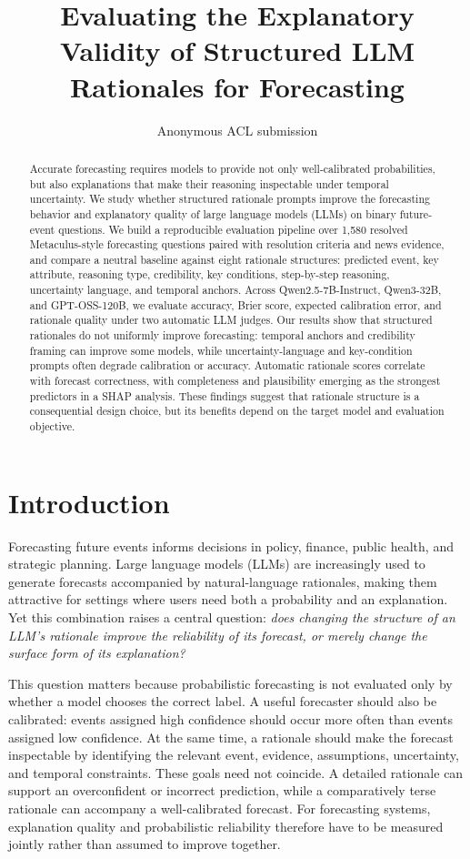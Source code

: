 \documentclass[11pt]{article}
\title{Evaluating the Explanatory Validity of Structured LLM Rationales for Forecasting}
\author{Anonymous ACL submission}
\date{}
\begin{document}
\maketitle

\begin{abstract}
Accurate forecasting requires models to provide not only well-calibrated probabilities, but also explanations that make their reasoning inspectable under temporal uncertainty.
We study whether structured rationale prompts improve the forecasting behavior and explanatory quality of large language models (LLMs) on binary future-event questions.
We build a reproducible evaluation pipeline over 1,580 resolved Metaculus-style forecasting questions paired with resolution criteria and news evidence, and compare a neutral baseline against eight rationale structures: predicted event, key attribute, reasoning type, credibility, key conditions, step-by-step reasoning, uncertainty language, and temporal anchors.
Across Qwen2.5-7B-Instruct, Qwen3-32B, and GPT-OSS-120B, we evaluate accuracy, Brier score, expected calibration error, and rationale quality under two automatic LLM judges.
Our results show that structured rationales do not uniformly improve forecasting: temporal anchors and credibility framing can improve some models, while uncertainty-language and key-condition prompts often degrade calibration or accuracy.
Automatic rationale scores correlate with forecast correctness, with completeness and plausibility emerging as the strongest predictors in a SHAP analysis.
These findings suggest that rationale structure is a consequential design choice, but its benefits depend on the target model and evaluation objective.
\end{abstract}

\section{Introduction}

Forecasting future events informs decisions in policy, finance, public health, and strategic planning.
Large language models (LLMs) are increasingly used to generate forecasts accompanied by natural-language rationales, making them attractive for settings where users need both a probability and an explanation.
Yet this combination raises a central question: \textit{does changing the structure of an LLM's rationale improve the reliability of its forecast, or merely change the surface form of its explanation?}

This question matters because probabilistic forecasting is not evaluated only by whether a model chooses the correct label.
A useful forecaster should also be calibrated: events assigned high confidence should occur more often than events assigned low confidence.
At the same time, a rationale should make the forecast inspectable by identifying the relevant event, evidence, assumptions, uncertainty, and temporal constraints.
These goals need not coincide.
A detailed rationale can support an overconfident or incorrect prediction, while a comparatively terse rationale can accompany a well-calibrated forecast.
For forecasting systems, explanation quality and probabilistic reliability therefore have to be measured jointly rather than assumed to improve together.
\end{document}

